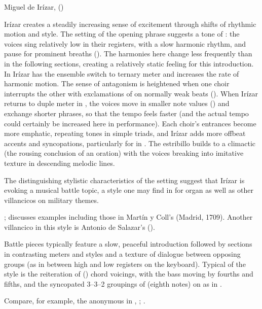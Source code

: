 {Miguel de Irízar, 
()}

Irízar creates a steadily increasing sense of excitement through shifts of
rhythmic motion and style.
The setting of the opening phrase suggests a tone of : the
voices sing relatively low in their registers, with a slow harmonic rhythm, and
pause for prominent breaths ().
The harmonies here change less frequently than in the following sections,
creating a relatively static feeling for this introduction.
In  Irízar has the ensemble switch to ternary meter and increases
the rate of harmonic motion.
The sense of antagonism is heightened when one choir interrupts the other with
exclamations of  on normally weak beats ().
When Irízar returns to duple meter in , the voices move in smaller
note values () and exchange shorter phrases, so that the tempo
feels faster (and the actual tempo could certainly be increased here in
performance).
Each choir's entrances become more emphatic, repeating tones in simple triads,
and Irízar adds more offbeat accents and syncopations, particularly for  in .
The estribillo builds to a climactic  (the rousing conclusion of
an oration) with the voices breaking into imitative texture in descending
melodic lines.

The distinguishing stylistic characteristics of the setting suggest that Irízar
is evoking a musical battle topic, a style one may find in  for
organ as well as other villancicos on military themes.%
\begin{Footnote}
    \Autocite[]{Grove}; 
    \autocite{Sutton:IberianBatalla} discusses examples including those in
    Martín y Coll's  (Madrid, 1709).
    Another villancico in this style is Antonio de Salazar's  ().
\end{Footnote}
Battle pieces typically feature a slow, peaceful introduction followed by
sections in contrasting meters and styles and a texture of dialogue between
opposing groups (as in between high and low registers on the keyboard).  
Typical of the style is the reiteration of  () chord voicings, with the bass moving by fourths and fifths, and the
syncopated 3--3--2 groupings of  (eighth notes) on  as in .%
\begin{Footnote}
    Compare, for example, the anonymous  in ,
    ; \autocite{Araujo:Batalla}.  
\end{Footnote}

